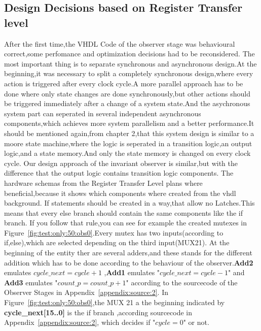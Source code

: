 \subsection{Design Decisions based on Register Transfer level}

After the first time,the VHDL Code of the observer stage was behavioural correct,some perfomance and optimization decisions had to be reconsidered.
The most important thing is to separate synchronous and asynchronous design.At the beginning,it was necessary to split a completely synchronous design,where
every action is triggered after every clock cycle.A more parallel approach has to be done where only state changes are done synchronously,but other actions should
be triggered immediately after a change of a system state.And the asychronous system part can seperated in several independent asynchronous components,which achieves more 
system parallelism and a better performance.It should be mentioned again,from chapter 2,that this system design is similar to a moore state machine,where the logic 
is seperated in a transition logic,an output logic,and a state memory.And only the state memory is changed on every clock cycle.\newline
Our design approach of the invariant observer is similar,but with the difference that the output logic contains transition logic components.
The hardware schemas from the Register Transfer Level plans where beneficial,because it shows which components where created from the vhdl background.
If statements should be created in a way,that allow no Latches.This means that every else branch should contain the same components like the if branch.
If you follow that rule,you can see for example the created mutexes in Figure~\ref{fig:test:only:50:obs0}.Every mutex has two inputs(according to if,else),which are
selected depending on the third input(MUX21).\newline
At the beginning of the entity ther are several adders,and these stands for the different addition 
which has to be done according to the behaviour of the observer.\textbf{Add2} emulates $cycle\_next=cycle+1$ ,\textbf{Add1} emulates "$cycle\_next=cycle-1$" and \textbf{Add3} 
emulates "$count\_p=count\_p+1$" according to the sourcecode of the Observer Stages in Appendix~\ref{appendix:source:2}.
In Figure~\ref{fig:test:only:50:obs0},the MUX 21 a the beginning indicated by \textbf{cycle\_next[15..0]} is the if branch ,according sourcecode in Appendix~\ref{appendix:source:2},
which decides if "$cycle=0$" or not. \newline
